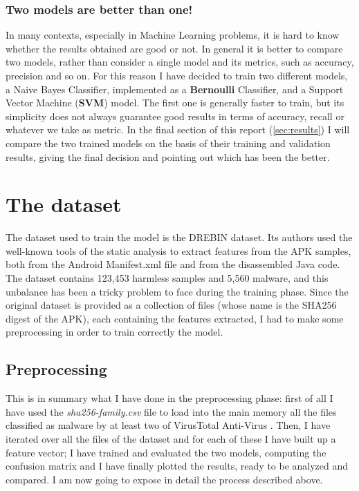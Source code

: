 \documentclass[12pt]{article}
\begin{document}
\subsubsection{Two models are better than one!}
\label{sec:models}
In many contexts, especially in Machine Learning problems, it is hard to know whether the results obtained are good or not. In general it is better to compare \cite{Main Book} two models, rather than consider a single model and its metrics, such as accuracy, precision and so on.
For this reason I have decided to train two different models, a Naive Bayes Classifier, implemented as a \textbf{Bernoulli} Classifier, and a Support Vector Machine (\textbf{SVM}) model. The first one is generally faster to train, but its simplicity does not always guarantee good results in terms of accuracy, recall or whatever we take as metric.
In the final section of this report (\ref{sec:results}) I will compare the two trained models on the basis of their training and validation results, giving the final decision and pointing out which has been the better.

\section{The dataset}
\label{sec:dataset}
The dataset used to train the model is the DREBIN dataset. Its authors used the well-known tools of the static analysis to extract features from the APK samples, both from the Android Manifest.xml file and from the disassembled Java code. The dataset contains 123,453 harmless samples and 5,560 malware, and this unbalance has been a tricky problem to face during the training phase. Since the original dataset is provided as a collection of files (whose name is the SHA256 digest of the APK), each containing the features extracted, I had to make some preprocessing in order to train correctly the model. 

\subsection{Preprocessing}
This is in summary what I have done in the preprocessing phase: first of all I have used the \textit{sha256-family.csv} file to load into the main memory all the files classified as malware by at least two of VirusTotal Anti-Virus \cite{DREBIN}. Then, I have iterated over all the files of the dataset and for each of these I have built up a feature vector; I have trained and evaluated the two models, computing the confusion matrix and I have finally plotted the results, ready to be analyzed and compared. I am now going to expose in detail the process described above. 
\end{document}
